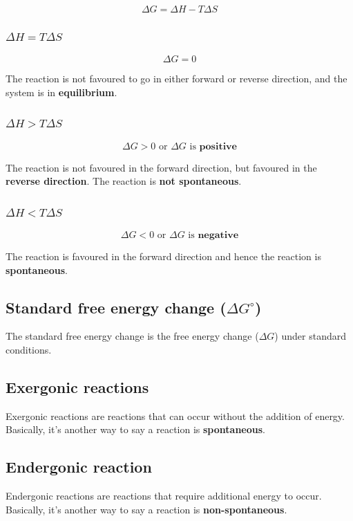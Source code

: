 \documentclass[11pt]{article}
\begin{document}
\[\Delta G = \Delta H - T \Delta S\]

\subsubsection{\(\Delta H = T \Delta S\)}
\label{sec:org9a335da}
\[\Delta G = 0\]

The reaction is not favoured to go in either forward or reverse direction, and the system is in \textbf{equilibrium}.

\subsubsection{\(\Delta H > T \Delta S\)}
\label{sec:orgc191950}
\[\Delta G > 0 \text{ or } \Delta G \text{ is } \textbf{positive}\]

The reaction is not favoured in the forward direction, but favoured in the \textbf{reverse direction}. The reaction is \textbf{not spontaneous}.

\subsubsection{\(\Delta H < T \Delta S\)}
\label{sec:orgef8627c}
\[\Delta G < 0 \text{ or } \Delta G \text{ is } \textbf{negative}\]

The reaction is favoured in the forward direction and hence the reaction is \textbf{spontaneous}.

\subsection{Standard free energy change (\(\Delta G^{\circ}\))}
\label{sec:org97f8da5}
The standard free energy change is the free energy change (\(\Delta G\)) under standard conditions.

\subsection{Exergonic reactions}
\label{sec:orge006f3a}
Exergonic reactions are reactions that can occur without the addition of energy. Basically, it's another way to say a reaction is \textbf{spontaneous}.

\subsection{Endergonic reaction}
\label{sec:orgb8b6f32}
Endergonic reactions are reactions that require additional energy to occur. Basically, it's another way to say a reaction is \textbf{non-spontaneous}.
\end{document}
